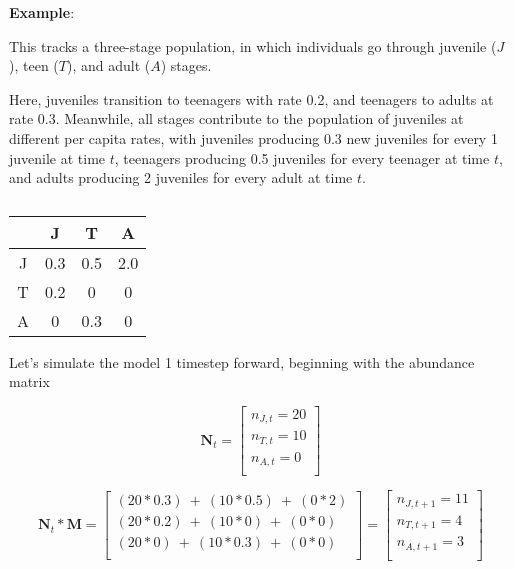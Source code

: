 \documentclass[12pt]{article}
\begin{document}
\bigskip








\textbf{Example}:

This tracks a three-stage population, in which individuals go through juvenile ($J$), teen ($T$), and adult ($A$) stages. 

Here, juveniles transition to teenagers with rate 0.2, and teenagers to adults at rate 0.3. Meanwhile, all stages contribute to the population of juveniles at different per capita rates, with juveniles producing 0.3 new juveniles for every 1 juvenile at time $t$, teenagers producing 0.5 juveniles for every teenager at time $t$, and adults producing 2 juveniles for every adult at time $t$. 



\begin{table}[h!]
\centering
\caption{}
\vspace{0.5cm}
\begin{tabular}{cccc}
& J & T & A \\
  \hline
J & 0.3  & 0.5  & 2.0 \\
T & 0.2  & 0    & 0   \\
A & 0    & 0.3  & 0 \\
\hline
\end{tabular}
\end{table}


Let's simulate the model 1 timestep forward, beginning with the abundance matrix 


\begin{equation*}
\mathbf{N}_{t}= \begin{bmatrix}
n_{J, t} = 20 \\ 
n_{T, t} = 10 \\ 
n_{A, t} = 0  \\
\end{bmatrix}
\end{equation*}




\begin{equation}
\mathbf{N}_{t} * \mathbf{M} = \begin{bmatrix}
(20 * 0.3) \ + \ (10 * 0.5) \ + \ (0 * 2)     \\
(20 * 0.2) \ + \ (10 * 0 ) \ + \ (0 * 0)    \\
(20 * 0 ) \ + \ (10 * 0.3) \ + \ (0 * 0)   \\
\end{bmatrix} = \begin{bmatrix}
n_{J, t+1} = 11 \\ 
n_{T, t+1} =  4 \\ 
n_{A, t+1} =  3 \\
\end{bmatrix}
\end{equation}
\end{document}
